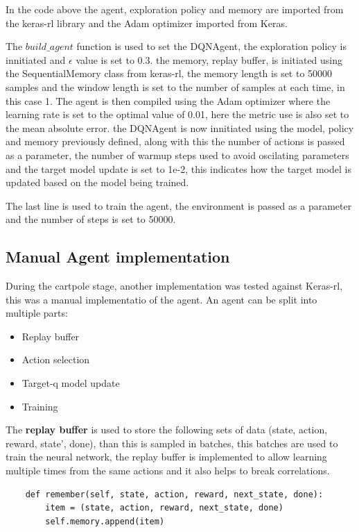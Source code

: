 In the code above the agent, exploration policy and memory are imported from the keras-rl library and the Adam optimizer imported from Keras.

The $build\_agent$ function is used to set the DQNAgent, the exploration policy is innitiated and $\epsilon$ value is set to 0.3.
the memory, replay buffer, is initiated using the SequentialMemory class from keras-rl, the memory length is set to 50000 samples and the window length is set to the number of samples at each time, in this case 1.
The agent is then compiled using the Adam optimizer where the learning rate is set to the optimal value of 0.01, here the metric use is also set to the mean absolute error.
the DQNAgent is now innitiated using the model, policy and memory previously defined, along with this the number of actions is passed as a parameter, the number of warmup steps used to avoid oscilating parameters and the target model update is set to 1e-2, this indicates how the target model is updated based on the model being trained.

The last line is used to train the agent, the environment is passed as a parameter and the number of steps is set to 50000.

\subsection*{Manual Agent implementation}
During the cartpole stage, another implementation was tested against Keras-rl, this was a manual implementatio of the agent.
An agent can be split into multiple parts:
\begin{itemize}
    \item Replay buffer
    \item Action selection
    \item Target-q model update
    \item Training
\end{itemize}

The \textbf{replay buffer} is used to store the following sets of data (state, action, reward, state', done), than this is sampled in batches, this batches are used to train the neural network, the replay buffer is implemented to allow learning multiple times from the same actions and it also helps to break correlations.
\lstset{language=Python}
\lstset{frame=lines}
\lstset{basicstyle=\footnotesize}
\begin{lstlisting}
    def remember(self, state, action, reward, next_state, done):
        item = (state, action, reward, next_state, done)
        self.memory.append(item)
\end{lstlisting}


